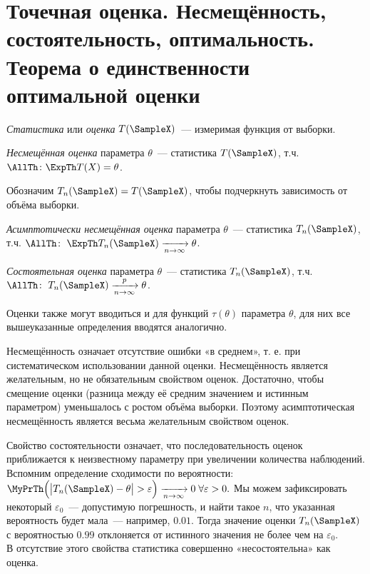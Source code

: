 \section{Точечная оценка. Несмещённость, состоятельность, оптимальность. Теорема о единственности оптимальной оценки}
\begin{defn}
    \textit{Статистика} или \textit{оценка} $T(\SampleX)$~--- измеримая функция от выборки.
\end{defn}

\begin{defn}
    \textit{Несмещённая оценка} параметра $\theta$~--- статистика $T(\SampleX)$, т.ч. $\AllTh\colon \ExpTh T(X) = \theta$.
\end{defn}

Обозначим $T_n(\SampleX) = T(\SampleX)$, чтобы подчеркнуть зависимость от объёма выборки.
\begin{defn}
    \textit{Асимптотически несмещённая оценка} параметра $\theta$~--- статистика $T_n(\SampleX)$, т.ч. $\AllTh \colon \; \ExpTh T_n(\SampleX) \xrightarrow[n \to \infty]{} \theta$.
\end{defn}

\begin{defn}
    \textit{Состоятельная оценка} параметра $\theta$~--- статистика $T_n(\SampleX)$, т.ч. $\AllTh \colon \; T_n(\SampleX) \xrightarrow[n \to \infty]{p} \theta$.
\end{defn}

Оценки также могут вводиться и для функций $\tau(\theta)$ параметра $\theta$, для них все вышеуказанные определения вводятся аналогично.

Несмещённость означает отсутствие ошибки «в среднем», т. е. при систематическом использовании данной оценки. 
Несмещённость является желательным, но не обязательным свойством оценок. 
Достаточно, чтобы смещение оценки (разница между её средним значением и истинным параметром) уменьшалось с ростом объёма выборки. 
Поэтому асимптотическая несмещённость является весьма желательным свойством оценок. 

Свойство состоятельности означает, что последовательность оценок приближается к неизвестному параметру при увеличении количества наблюдений. 
Вспомним определение сходимости по вероятности: ${\MyPrTh \Bigl(\bigl| T_n(\SampleX) - \theta \bigr| > \varepsilon \Bigr) \xrightarrow[n \to \infty]{} 0} \; \forall  \varepsilon > 0.$
Мы можем зафиксировать некоторый $\varepsilon_0$~--- допустимую погрешность, и найти такое $n$, что указанная вероятность будет мала~--- например, $0.01$. 
Тогда значение оценки $T_n(\SampleX)$ с вероятностью $0.99$ отклоняется от истинного значения не более чем на $\varepsilon_0$.\\
В отсутствие этого свойства статистика совершенно «несостоятельна» как оценка.


